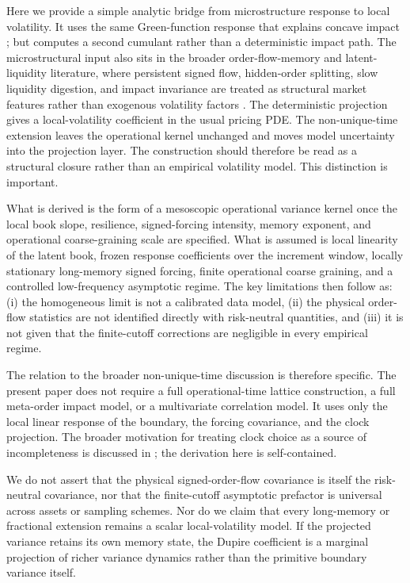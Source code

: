\documentclass[11pt]{amsart}
\theoremstyle{definition}
\theoremstyle{plain}
\theoremstyle{remark}
\begin{document}
Here we provide a simple analytic bridge from microstructure response to local volatility. It uses the same Green-function response that explains concave impact \cite{toth2011anomalous,Mastromatteo2014, Donier2015}; but computes a second cumulant rather than a deterministic impact path. The microstructural input also sits in the broader order-flow-memory and latent-liquidity literature, where persistent signed flow, hidden-order splitting, slow liquidity digestion, and impact invariance are treated as structural market features rather than exogenous volatility factors \cite{LilloMikeFarmer2005,Bouchaud2004,bouchaud2009markets,Benzaquen2018}. The deterministic projection gives a local-volatility coefficient in the usual pricing PDE. The non-unique-time extension leaves the operational kernel unchanged and moves model uncertainty into the projection layer. The construction should therefore be read as a structural closure rather than an empirical volatility model. This distinction is important.

What is derived is the form of a mesoscopic operational variance kernel once the local book slope, resilience, signed-forcing intensity, memory exponent, and operational coarse-graining scale are specified. What is assumed is local linearity of the latent book, frozen response coefficients over the increment window, locally stationary long-memory signed forcing, finite operational coarse graining, and a controlled low-frequency asymptotic regime. The key limitations then follow as: (i) the homogeneous limit is not a calibrated data model, (ii) the physical order-flow statistics are not identified directly with risk-neutral quantities, and (iii) it is not given that the finite-cutoff corrections are negligible in every empirical regime.

The relation to the broader non-unique-time discussion is therefore specific. The present paper does not require a full operational-time lattice construction, a full meta-order impact model, or a multivariate correlation model. It uses only the local linear response of the boundary, the forcing covariance, and the clock projection. The broader motivation for treating clock choice as a source of incompleteness is discussed in \cite{AngstmannGebbie2026NonUniqueTime}; the derivation here is self-contained.

We do not assert that the physical signed-order-flow covariance is itself the risk-neutral covariance, nor that the finite-cutoff asymptotic prefactor is universal across assets or sampling schemes. Nor do we claim that every long-memory or fractional extension remains a scalar local-volatility model. If the projected variance retains its own memory state, the Dupire coefficient is a marginal projection of richer variance dynamics rather than the primitive boundary variance itself. 
\end{document}
